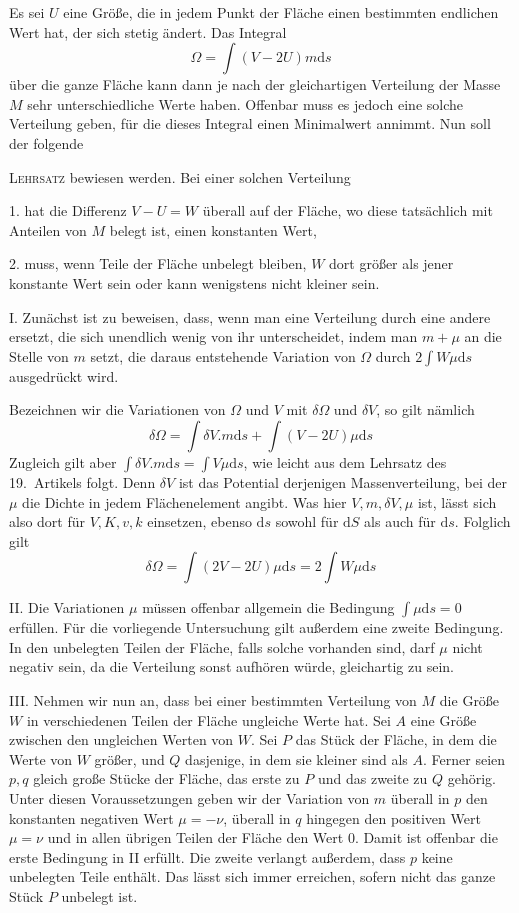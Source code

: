 Es sei $U$ eine Größe, die in jedem Punkt der Fläche einen bestimmten endlichen Wert hat, der sich stetig ändert. Das Integral
\[
\Omega=\int(V-2U)m\mathrm ds
\]
über die ganze Fläche kann dann je nach der gleichartigen Verteilung der Masse $M$ sehr unterschiedliche Werte haben. Offenbar
muss es jedoch eine solche Verteilung geben, für die dieses Integral einen Minimalwert annimmt. Nun soll der folgende

\textsc{Lehrsatz} bewiesen werden. Bei einer solchen Verteilung

1. hat die Differenz $V-U=W$ überall auf der Fläche, wo diese tatsächlich mit Anteilen von $M$ belegt ist, einen konstanten Wert,

2. muss, wenn Teile der Fläche unbelegt bleiben, $W$ dort größer als jener konstante Wert sein oder kann wenigstens nicht kleiner sein.

I. Zunächst ist zu beweisen, dass, wenn man eine Verteilung durch eine andere ersetzt, die sich unendlich wenig von ihr unterscheidet, indem man $m+\mu$ an die Stelle von $m$ setzt, die daraus entstehende Variation von $\Omega$ durch $2\int W\mu\mathrm ds$ ausgedrückt wird.

Bezeichnen wir die Variationen von $\Omega$ und $V$ mit $\delta\Omega$ und $\delta V$, so gilt nämlich
\[
\delta\Omega=\int\delta V.m\mathrm ds+\int(V-2U)\mu\mathrm ds
\]
Zugleich gilt aber $\int\delta V.m\mathrm ds=\int V\mu\mathrm ds$, wie leicht aus dem Lehrsatz des 19.\ Artikels folgt. Denn $\delta V$ ist das Potential derjenigen Massenverteilung, bei der $\mu$ die Dichte in jedem Flächenelement angibt. Was hier $V,m,\delta V,\mu$ ist, lässt sich also dort für $V,K,v,k$ einsetzen, ebenso $\mathrm ds$ sowohl für $\mathrm dS$ als auch für $\mathrm ds$. Folglich gilt
\[
\delta\Omega=\int(2V-2U)\mu\mathrm ds=2\int W\mu\mathrm ds
\]

II. Die Variationen $\mu$ müssen offenbar allgemein die Bedingung $\int\mu\mathrm ds=0$ erfüllen. Für die vorliegende Untersuchung gilt außerdem eine zweite Bedingung. In den unbelegten Teilen der Fläche, falls solche vorhanden sind, darf $\mu$ nicht negativ sein, da die Verteilung sonst aufhören würde, gleichartig zu sein.

III. Nehmen wir nun an, dass bei einer bestimmten Verteilung von $M$ die Größe $W$ in verschiedenen Teilen der Fläche ungleiche Werte hat. Sei $A$ eine Größe zwischen den ungleichen Werten von $W$. Sei $P$ das Stück der Fläche, in dem die Werte von $W$ größer, und $Q$ dasjenige, in dem sie kleiner sind als $A$. Ferner seien $p,q$ gleich große Stücke der Fläche, das erste zu $P$ und das zweite zu $Q$ gehörig. Unter diesen Voraussetzungen geben wir der Variation
von $m$ überall in $p$ den konstanten negativen Wert $\mu=-\nu$, überall in $q$ hingegen den positiven Wert $\mu=\nu$ und in allen übrigen Teilen der Fläche den Wert $0$. Damit ist offenbar die erste Bedingung in II erfüllt. Die zweite verlangt außerdem, dass $p$ keine unbelegten Teile enthält. Das lässt sich immer erreichen, sofern nicht das ganze Stück $P$ unbelegt ist.

